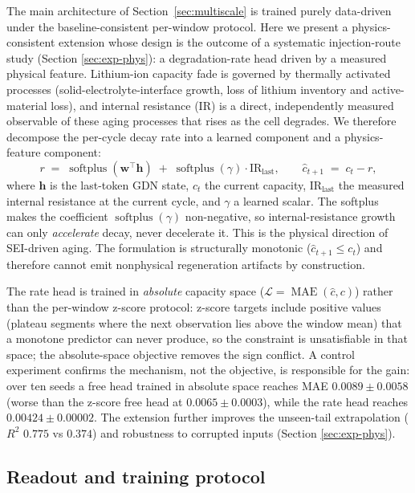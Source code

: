 \documentclass[final,5p,times,twocolumn]{elsarticle}
\begin{document}
The main architecture of Section~\ref{sec:multiscale} is trained
purely data-driven under the baseline-consistent per-window protocol.
Here we present a physics-consistent extension whose design is the
outcome of a systematic injection-route study (Section
\ref{sec:exp-phys}): a degradation-rate head driven by a measured
physical feature. Lithium-ion capacity fade is governed by
thermally activated processes (solid-electrolyte-interface growth,
loss of lithium inventory and active-material loss), and internal
resistance (IR) is a direct, independently measured observable of
these aging processes that rises as the cell degrades. We therefore
decompose the per-cycle decay rate into a learned component and a
physics-feature component:
\begin{equation}
\label{eq:rate_head}
r \;=\; \operatorname{softplus}(\mathbf{w}^{\top}\mathbf{h})
\;+\; \operatorname{softplus}(\gamma)\cdot \mathrm{IR}_{\text{last}},
\qquad
\hat{c}_{t+1} \;=\; c_t - r,
\end{equation}
where $\mathbf{h}$ is the last-token GDN state, $c_t$ the current
capacity, $\mathrm{IR}_{\text{last}}$ the measured internal
resistance at the current cycle, and $\gamma$ a learned scalar. The
softplus makes the coefficient $\operatorname{softplus}(\gamma)$
non-negative, so internal-resistance growth can only \emph{accelerate}
decay, never decelerate it. This is the physical direction of SEI-driven
aging. The formulation is structurally monotonic
($\hat{c}_{t+1} \le c_t$) and therefore cannot emit nonphysical
regeneration artifacts by construction.

The rate head is trained in \emph{absolute} capacity space
($\mathcal{L} = \operatorname{MAE}(\hat{c}, c)$) rather than the
per-window z-score protocol: z-score targets include positive values
(plateau segments where the next observation lies above the window
mean) that a monotone predictor can never produce, so the constraint
is unsatisfiable in that space; the absolute-space objective removes
the sign conflict. A control experiment confirms the mechanism, not
the objective, is responsible for the gain: over ten seeds a free head
trained in absolute space reaches MAE $0.0089\pm0.0058$ (worse than
the z-score free head at $0.0065\pm0.0003$), while the rate head
reaches $0.00424\pm0.00002$. The extension
further improves the unseen-tail extrapolation ($R^2$ $0.775$ vs
$0.374$) and robustness to corrupted inputs (Section
\ref{sec:exp-phys}).

\subsection{Readout and training protocol}
\label{sec:readout}
\end{document}

